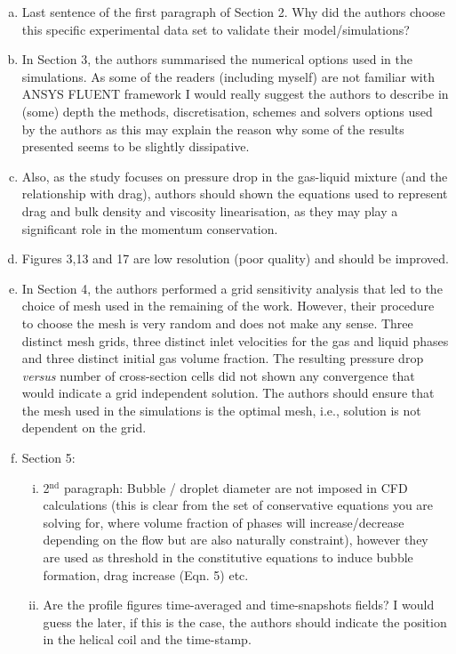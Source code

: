 \documentclass[14pt,twoside]{report}
\begin{document}
{{{\begin{enumerate}[(a)]
%
\item Last sentence of the first paragraph of Section 2. Why did the authors choose this specific experimental data set to validate their model/simulations?
%
\item In Section 3, the authors summarised the numerical options used in the simulations. As some of the readers (including myself) are not familiar with ANSYS FLUENT framework I would really suggest the authors to describe in (some) depth the methods, discretisation, schemes and solvers options used by the authors as this may explain the reason why some of the results presented seems to be slightly dissipative. 
%
\item Also, as the study focuses on pressure drop in the gas-liquid mixture (and the relationship with drag), authors should shown the equations used to represent drag and bulk density and viscosity linearisation, as they may play a significant role in the momentum conservation.
%
\item Figures 3,13 and 17 are low resolution (poor quality) and should be improved.
%
\item In Section 4, the authors performed a grid sensitivity analysis that led to the choice of mesh used in the remaining of the work. However, their procedure to choose the mesh is very random and does not make any sense. Three distinct mesh grids, three distinct inlet velocities for the gas and liquid phases and three distinct initial gas volume fraction. The resulting pressure drop {\it versus} number of cross-section cells did not shown any convergence that would indicate a grid independent solution. The authors should ensure that the mesh used in the simulations is the optimal mesh, i.e., solution is not dependent on the grid. 
%
\item Section 5: 
\begin{enumerate}[(i)]
%
\item 2$^{\text{nd}}$ paragraph: Bubble / droplet diameter are not imposed in CFD calculations (this is clear from the set of conservative equations you are solving for, where volume fraction of phases will increase/decrease depending on the flow but are also naturally constraint), however they are used as threshold in the constitutive equations to induce bubble formation, drag increase (Eqn. 5) etc.
%
\item Are the profile figures time-averaged and time-snapshots fields? I would guess the later, if this is the case, the authors should indicate the position in the helical coil and the time-stamp.
%

\end{enumerate}
\end{enumerate}}}}
\end{document}
